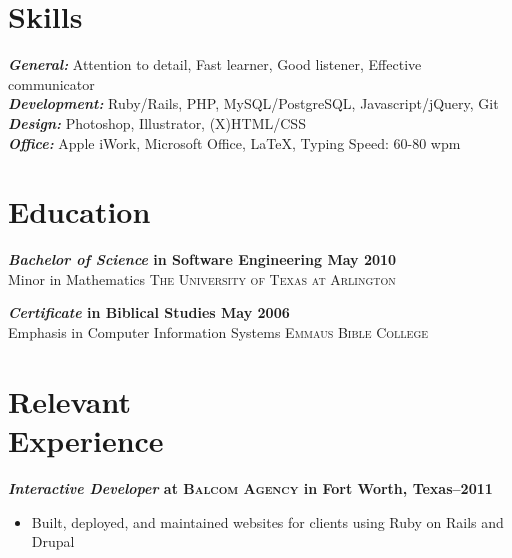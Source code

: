 \documentclass[margin]{res}
\newcommand{\sectionspace}{\vspace{8pt}}
\begin{document}
\begin{resume}

\section{\textsf{Skills}}

              
                \textbf{\textit{General:}} Attention to detail, Fast learner, Good listener, Effective communicator  \\
                \textbf{\textit{Development:}} Ruby/Rails, PHP, MySQL/PostgreSQL, Javascript/jQuery, Git  \\
                \textbf{\textit{Design:}} Photoshop, Illustrator, (X)HTML/CSS  \\
                \textbf{\textit{Office:}} Apple iWork, Microsoft Office, \LaTeX, Typing Speed: 60-80 wpm  \\
\sectionspace

\section{\textsf{Education}}
              
                \textbf{\textit{Bachelor of Science} in Software Engineering \dotfill May 2010 }  \\
                Minor in Mathematics \hfill  \textsc{The University of Texas at Arlington}
              
                \textbf{\textit{Certificate} in Biblical Studies \dotfill May 2006 }  \\
                Emphasis in Computer Information Systems \hfill  \textsc{Emmaus Bible College}
              
\sectionspace


\section{\textsf{Relevant \\ Experience}}

              
                \textbf{\textit{Interactive Developer}
                 at \textsc{Balcom Agency} in Fort Worth, Texas--2011}
                 \vspace{-10pt}\begin{itemize} \itemsep -2pt %
                   \item Built, deployed, and maintained websites for clients using Ruby on Rails and Drupal
                 

\end{itemize}
\end{resume}
\end{document}
